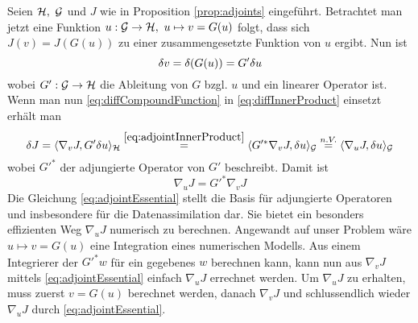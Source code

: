 Seien $\mathcal{H},~\mathcal{G}$ und $J$ wie in Proposition \ref{prop:adjoints} eingeführt. Betrachtet man jetzt eine Funktion $u:\mathcal{G} \to \mathcal{H}, ~u\mapsto v = G(u)$ folgt, dass sich $J(v) = J(G(u))$ zu einer zusammengesetzte Funktion von $u$ ergibt. Nun ist 
\begin{equation}
\label{eq:diffCompoundFunction}
\delta v = \delta(G(u)) = G'\delta u
\end{equation}
wobei $G':\mathcal{G}\to\mathcal{H}$ die Ableitung von $G$ bzgl. $u$ und ein linearer Operator ist. Wenn man nun \eqref{eq:diffCompoundFunction} in \eqref{eq:diffInnerProduct} einsetzt erhält man 
\begin{equation}
 \delta J = \langle \nabla_v J,G'\delta u\rangle_{\mathcal{H}} \overset{\eqref{eq:adjointInnerProduct}}{=}  \langle G'^* \nabla_v J,\delta u\rangle_{\mathcal{G}} \overset{n.V.}{=} \langle \nabla_u J,\delta u\rangle_{\mathcal{G}} 
\end{equation}
wobei $G'^*$ der adjungierte Operator von $G'$ beschreibt. Damit ist 
\begin{equation}
\label{eq:adjointEssential}
\nabla_u J = G'^*\nabla_v J
\end{equation} 
Die Gleichung \eqref{eq:adjointEssential} stellt die Basis für adjungierte Operatoren und insbesondere für die Datenassimilation dar. Sie bietet ein besonders effizienten Weg $\nabla_u J$ numerisch zu berechnen. Angewandt auf unser Problem wäre $u\mapsto v =G(u) $ eine Integration eines numerischen Modells. Aus einem Integrierer der $G'^*w$ für ein gegebenes $w$ berechnen kann, kann nun aus $\nabla_v J$ mittels \eqref{eq:adjointEssential} einfach $\nabla_u J$ errechnet werden. 
Um $\nabla_u J$ zu erhalten, muss zuerst $v = G(u)$ berechnet werden, danach $\nabla_v J$ und schlussendlich wieder $\nabla_u J$ durch \eqref{eq:adjointEssential}.

